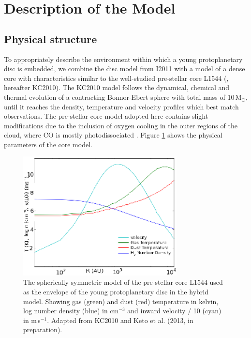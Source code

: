 \documentclass[useAMS,usenatbib]{mn2e}
\begin{document}
\section{Description of the Model} \label{sec:description_model}

\subsection{Physical structure} \label{subsec:physical_structure}

To appropriately describe the environment within which a young protoplanetary disc is embedded, we combine the disc model from I2011 with a model of a dense core with characteristics similar to the well-studied pre-stellar core L1544 (\citealt{Keto2010}, hereafter KC2010). The KC2010 model follows the dynamical, chemical and thermal evolution of a contracting Bonnor-Ebert sphere \citep{Bonnor1956,Ebert1957} with total mass of 10\,M$_{\odot}$, until it reaches the density, temperature and velocity profiles which best match observations. The pre-stellar core model adopted here contains slight modifications due to the inclusion of oxygen cooling in the outer regions of the cloud, where CO is mostly photodissociated \citep{Caselli2012}. Figure \ref{fig:l1544_model} shows the physical parameters of the core model. \smallskip

\begin{figure}
 \includegraphics[width=84mm]{Figures/model/L1544model_used_legend_small.eps}
 \caption{The spherically symmetric model of the pre-stellar core L1544 used as the envelope of the young protoplanetary disc in the hybrid model. Showing gas (green) and dust (red) temperature in kelvin, log number density (blue) in cm$^{-3}$ and inward velocity / 10 (cyan) in m$\,$s$^{-1}$. Adapted from KC2010 and Keto et al. (2013, in preparation).}
 \label{fig:l1544_model}
\end{figure}
\end{document}
